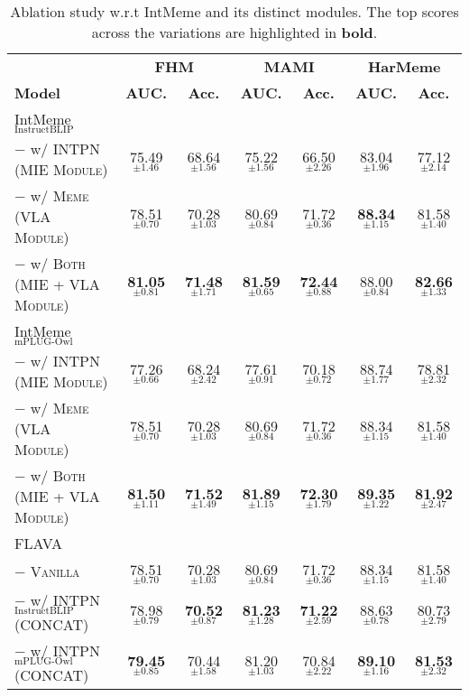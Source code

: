 \begin{table*}[t]
  \centering
  \begin{tabular}{lcccccc}
    \toprule
     &\multicolumn{2}{c}{\textbf{FHM}}&\multicolumn{2}{c}{\textbf{MAMI}}&\multicolumn{2}{c}{\textbf{HarMeme}} \\
     \cmidrule(lr){2-3} \cmidrule(lr){4-5} \cmidrule(lr){6-7}
    \textbf{Model} &\textbf{AUC.}&\textbf{Acc.} &\textbf{AUC.}&\textbf{Acc.} &\textbf{AUC.}&\textbf{Acc.} \\
    \midrule
    IntMeme$_\text{InstructBLIP}$ & & \\
    $-$  w/ \textsc{INTPN (MIE Module)} & 75.49$_{\pm1.46}$ & 68.64$_{\pm1.56}$ & 75.22$_{\pm1.56}$ & 66.50$_{\pm2.26}$ & 83.04$_{\pm1.96}$ & 77.12$_{\pm2.14}$  \\
    $-$  w/ \textsc{Meme (VLA Module)} & 78.51$_{\pm0.70}$ & 70.28$_{\pm1.03}$ & 80.69$_{\pm0.84}$ & 71.72$_{\pm0.36}$ & \textbf{88.34$_{\pm1.15}$} & 81.58$_{\pm1.40}$ \\
    $-$  w/ \textsc{Both (MIE + VLA Module)} & \textbf{81.05$_{\pm0.81}$} & \textbf{71.48$_{\pm1.71}$} & \textbf{81.59$_{\pm0.65}$} & \textbf{72.44$_{\pm0.88}$} & 88.00$_{\pm0.84}$ & \textbf{82.66$_{\pm1.33}$} \\
    \midrule
    IntMeme$_\text{mPLUG-Owl}$ & & \\
    $-$  w/ \textsc{INTPN (MIE Module)} & 77.26$_{\pm0.66}$ & 68.24$_{\pm2.42}$ & 77.61$_{\pm0.91}$ & 70.18$_{\pm0.72}$ & 88.74$_{\pm1.77}$ & 78.81$_{\pm2.32}$  \\
    $-$  w/ \textsc{Meme (VLA Module)} & 78.51$_{\pm0.70}$ & 70.28$_{\pm1.03}$ & 80.69$_{\pm0.84}$ & 71.72$_{\pm0.36}$ & 88.34$_{\pm1.15}$ & 81.58$_{\pm1.40}$ \\
    $-$  w/ \textsc{Both (MIE + VLA Module)} & \textbf{81.50$_{\pm1.11}$} & \textbf{71.52$_{\pm1.49}$} & \textbf{81.89$_{\pm1.15}$} & \textbf{72.30$_{\pm1.79}$} & \textbf{89.35$_{\pm1.22}$} & \textbf{81.92$_{\pm2.47}$} \\
    \midrule
    FLAVA \\
    $-$ \textsc{ Vanilla} & 78.51$_{\pm0.70}$ & 70.28$_{\pm1.03}$ & 80.69$_{\pm0.84}$ & 71.72$_{\pm0.36}$ & 88.34$_{\pm1.15}$ & 81.58$_{\pm1.40}$ \\
    $-$ w/ \textsc{INTPN}$_\text{InstructBLIP}$ \textsc{(CONCAT)} & 78.98$_{\pm0.79}$ & \textbf{70.52}$_{\pm0.87}$ & \textbf{81.23}$_{\pm1.28}$ & \textbf{71.22}$_{\pm2.59}$ & 88.63$_{\pm0.78}$ & 80.73$_{\pm2.79}$ \\
    $-$ w/ \textsc{INTPN}$_\text{mPLUG-Owl}$ \textsc{(CONCAT)} & \textbf{79.45}$_{\pm0.85}$ & 70.44$_{\pm1.58}$ & 81.20$_{\pm1.03}$  & 70.84$_{\pm2.22}$ & \textbf{89.10}$_{\pm1.16}$ & \textbf{81.53}$_{\pm2.32}$  \\
    \bottomrule
\end{tabular}
\caption{Ablation study w.r.t \textsf{IntMeme} and its distinct modules. The top scores across the variations are highlighted in \textbf{bold}.}
\label{tab:ablation-modules}
\end{table*}
